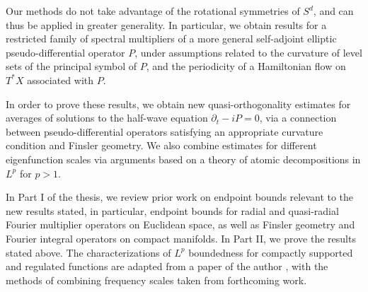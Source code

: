 
%
% 
%


Our methods do not take advantage of the rotational symmetries of $S^d$, and can thus be applied in greater generality. In particular, we obtain results for a restricted family of spectral multipliers of a more general self-adjoint elliptic pseudo-differential operator $P$, under assumptions related to the curvature of level sets of the principal symbol of $P$,  and the periodicity of a Hamiltonian flow on $T^* X$ associated with $P$.

In order to prove these results, we obtain new quasi-orthogonality estimates for averages of solutions to the half-wave equation $\partial_t - i P = 0$, via a connection between pseudo-differential operators satisfying an appropriate curvature condition and Finsler geometry.  We also combine estimates for different eigenfunction scales via arguments based on a theory of atomic decompositions in $L^p$ for $p > 1$.

In Part I of the thesis, we review prior work on endpoint bounds relevant to the new results stated, in particular, endpoint bounds for radial and quasi-radial Fourier multiplier operators on Euclidean space, as well as Finsler geometry and Fourier integral operators on compact manifolds. In Part II, we prove the results stated above. The characterizations of $L^p$ boundedness for compactly supported and regulated functions are adapted from a paper of the author \cite{Denson}, with the methods of combining frequency scales taken from forthcoming work.